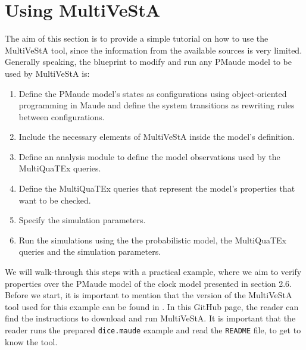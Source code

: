 \section{Using MultiVeStA}
The aim of this section is to provide a simple tutorial on how to use the MultiVeStA tool, since the information from the available sources is very limited. Generally speaking, the blueprint to modify and run any PMaude model to be used by MultiVeStA is:
\begin{enumerate}
    \item Define the PMaude model's states as configurations using object-oriented programming in Maude and define the system transitions as rewriting rules between configurations.
    \item Include the necessary elements of MultiVeStA inside the model's definition.
    \item Define an analysis module to define the model observations used by the MultiQuaTEx queries.
    \item Define the MultiQuaTEx queries that represent the model's properties that want to be checked.
    \item Specify the simulation parameters.
    \item Run the simulations using the the probabilistic model, the MultiQuaTEx queries and the simulation parameters.
\end{enumerate}
We will walk-through this steps with a practical example, where we aim to verify properties over the PMaude model of the clock model presented in section 2.6. Before we start, it is important to mention that the version of the MultiVeStA tool used for this example can be found in \cite{multiTool}. In this GitHub page, the reader can find the instructions to download and run MultiVeStA. It is important that the reader runs the prepared \texttt{dice.maude} example and read the \texttt{README} file, to get to know the tool.

